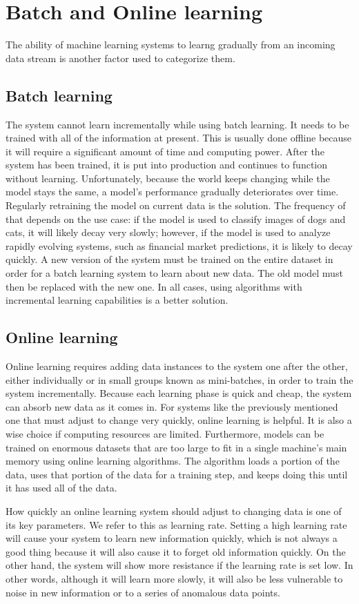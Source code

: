 \section{Batch and Online learning}
The ability of machine learning systems to learng gradually from an incoming data stream is another factor used to categorize them.

\subsection{Batch learning}
The system cannot learn incrementally while using batch learning. It needs to be trained with all of the information at present. This is usually done offline because it will require a significant amount of time and computing power. After the system has been trained, it is put into production and continues to function without learning. 
Unfortunately, because the world keeps changing while the model stays the same, a model's performance gradually deteriorates over time.
Regularly retraining the model on current data is the solution. The frequency of that depends on the use case: if the model is used to classify images of dogs and cats, it will likely decay very slowly; however, if the model is used to analyze rapidly evolving systems, such as financial market predictions, it is likely to decay quickly. 
A new version of the system must be trained on the entire dataset in order for a batch learning system to learn about new data. The old model must then be replaced with the new one. 
In all cases, using algorithms with incremental learning capabilities is a better solution. 

\subsection{Online learning}
Online learning requires adding data instances to the system one after the other, either individually or in small groups known as mini-batches, in order to train the system incrementally. 
Because each learning phase is quick and cheap, the system can absorb new data as it comes in. 
For systems like the previously mentioned one that must adjust to change very quickly, online learning is helpful.
It is also a wise choice if computing resources are limited.
Furthermore, models can be trained on enormous datasets that are too large to fit in a single machine's main memory using online learning algorithms. The algorithm loads a portion of the data, uses that portion of the data for a training step, and keeps doing this until it has used all of the data.

How quickly an online learning system should adjust to changing data is one of its key parameters. We refer to this as learning rate. Setting a high learning rate will cause your system to learn new information quickly, which is not always a good thing because it will also cause it to forget old information quickly. 
On the other hand, the system will show more resistance if the learning rate is set low. In other words, although it will learn more slowly, it will also be less vulnerable to noise in new information or to a series of anomalous data points.
